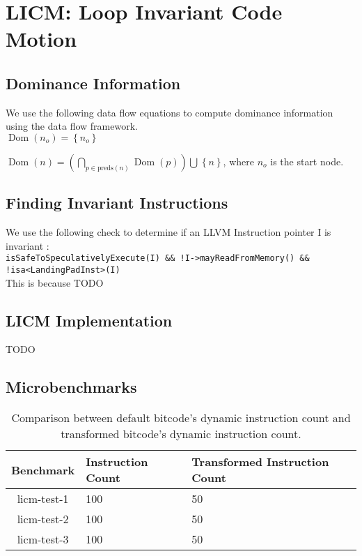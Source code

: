 \section{LICM: Loop Invariant Code Motion}

\subsection{Dominance Information}

We use the following data flow equations to compute dominance information using the
data flow framework. \\

$\operatorname{Dom}(n_o) = \left \{ n_o \right \}$

$\operatorname{Dom}(n) = \left ( \bigcap_{p \in \text{preds}(n)}^{} \operatorname{Dom}(p) \right ) \bigcup^{} \left \{ n \right \}$,
where $n_o$ is the start node.

\subsection{Finding Invariant Instructions}

We use the following check to determine if an LLVM Instruction pointer I is invariant :\\

\texttt{isSafeToSpeculativelyExecute(I) \&\& !I->mayReadFromMemory() \&\& !isa<LandingPadInst>(I)}\\

This is because TODO

\subsection{LICM Implementation}

TODO

\subsection{Microbenchmarks}

\begin{table}[!ht]
\centering
\begin{tabular}{c|l|l}
  \toprule
  \textbf{Benchmark} & \textbf{Instruction Count} & \textbf{Transformed Instruction Count} \\
  \midrule
  licm-test-1 & 100 & 50 \\ 
  licm-test-2 & 100 & 50 \\
  licm-test-3 & 100 & 50 \\ 
  \bottomrule
\end{tabular}
\caption{Comparison between default bitcode's dynamic instruction count and transformed
  bitcode's dynamic instruction count.}
\end{table}  


